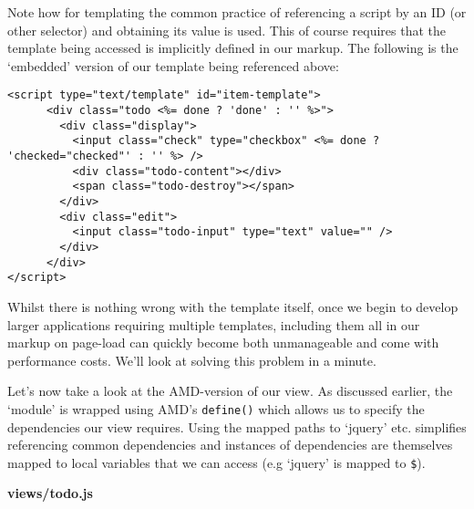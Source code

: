 \documentclass[9pt]{book}
\begin{document}
Note how for templating the common practice of referencing a script by
an ID (or other selector) and obtaining its value is used. This of
course requires that the template being accessed is implicitly defined
in our markup. The following is the `embedded' version of our template
being referenced above:

\begin{verbatim}
<script type="text/template" id="item-template">
      <div class="todo <%= done ? 'done' : '' %>">
        <div class="display">
          <input class="check" type="checkbox" <%= done ? 'checked="checked"' : '' %> />
          <div class="todo-content"></div>
          <span class="todo-destroy"></span>
        </div>
        <div class="edit">
          <input class="todo-input" type="text" value="" />
        </div>
      </div>
</script>
\end{verbatim}

Whilst there is nothing wrong with the template itself, once we begin to
develop larger applications requiring multiple templates, including them
all in our markup on page-load can quickly become both unmanageable and
come with performance costs. We'll look at solving this problem in a
minute.

Let's now take a look at the AMD-version of our view. As discussed
earlier, the `module' is wrapped using AMD's \texttt{define()} which
allows us to specify the dependencies our view requires. Using the
mapped paths to `jquery' etc. simplifies referencing common dependencies
and instances of dependencies are themselves mapped to local variables
that we can access (e.g `jquery' is mapped to \texttt{\$}).

\textbf{views/todo.js}
\end{document}
